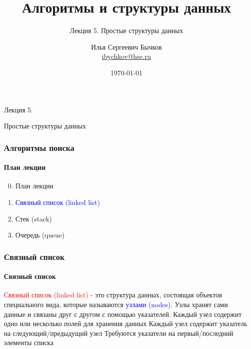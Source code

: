 \documentclass[aspectratio=169]{beamer}
\title[Title]{Алгоритмы и структуры данных}
\subtitle{Лекция 5. Простые структуры данных}
\author[Author's name]{Илья Сергеевич Бычков\\ \smallskip \scriptsize \url{ibychkov@hse.ru}}
\institute{НИУ ВШЭ - Нижний Новгород}
\date{\today}
\begin{document}
\frame[plain]{\titlepage}

\begin{frame}[c]

\begin{center}
\Huge Лекция 5.

\Huge Простые структуры данных
\end{center}

\end{frame}

\begin{frame}
\frametitle{Алгоритмы поиска}
\framesubtitle{План лекции}

\begin{enumerate}
  \setcounter{enumi}{-1}
  \item{План лекции}
  \item{\textcolor{blue}{Связный список (linked list)}}
  \item{Стек (stack)}
  \item{Очередь (queue)}
\end{enumerate}
\end{frame}



\begin{frame}
\frametitle{Связный список}
\framesubtitle{Связный список}
\justifying
\textcolor{red}{Связный список (linked list)} - это структура данных, состоящая  объектов специального вида, которые называются  \textcolor{blue}{узлами (nodes)}. Узлы хранят сами данные и связаны друг с другом с помощью указателей.\newline\newline
Каждый узел содержит одно или несколько полей для хранения данных\newline\newline
Каждый узел содержит указатель на следующий/предыдущий узел\newline\newline
Требуются указатели на первый/последний элементы списка\newline\newline
\end{frame}
\end{document}
